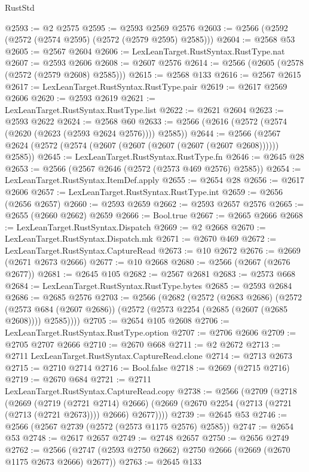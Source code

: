 \begin{lexlean}{RustStd}
\begin{coremodule}
@2593 := @2 @2575
@2595 := @2593 @2569 @2576
@2603 := @2566 (@2592 (@2572 (@2574 @2595) (@2572 (@2579 @2595) @2585)))
@2604 := @2568 @53
@2605 := @2567 @2604
@2606 := LexLeanTarget.RustSyntax.RustType.nat
@2607 := @2593 @2606
@2608 := @2607 @2576
@2614 := @2566 (@2605 (@2578 (@2572 (@2579 @2608) @2585)))
@2615 := @2568 @133
@2616 := @2567 @2615
@2617 := LexLeanTarget.RustSyntax.RustType.pair
@2619 := @2617 @2569 @2606
@2620 := @2593 @2619
@2621 := LexLeanTarget.RustSyntax.RustType.list
@2622 := @2621 @2604
@2623 := @2593 @2622
@2624 := @2568 @60
@2633 := @2566 (@2616 (@2572 (@2574 (@2620 (@2623 (@2593 @2624 @2576)))) @2585))
@2644 := @2566 (@2567 @2624 (@2572 (@2574 (@2607 (@2607 (@2607 (@2607 (@2607 @2608)))))) @2585))
@2645 := LexLeanTarget.RustSyntax.RustType.fn
@2646 := @2645 @28
@2653 := @2566 (@2567 @2646 (@2572 (@2573 @469 @2576) @2585))
@2654 := LexLeanTarget.RustSyntax.ItemDef.apply
@2655 := @2654 @28
@2656 := @2617 @2606
@2657 := LexLeanTarget.RustSyntax.RustType.int
@2659 := @2656 (@2656 @2657)
@2660 := @2593 @2659
@2662 := @2593 @2657 @2576
@2665 := @2655 (@2660 @2662) @2659
@2666 := Bool.true
@2667 := @2665 @2666
@2668 := LexLeanTarget.RustSyntax.Dispatch
@2669 := @2 @2668
@2670 := LexLeanTarget.RustSyntax.Dispatch.mk
@2671 := @2670 @469
@2672 := LexLeanTarget.RustSyntax.CaptureRead
@2673 := @10 @2672
@2676 := @2669 (@2671 @2673 @2666)
@2677 := @10 @2668
@2680 := @2566 (@2667 (@2676 @2677))
@2681 := @2645 @105
@2682 := @2567 @2681
@2683 := @2573 @668
@2684 := LexLeanTarget.RustSyntax.RustType.bytes
@2685 := @2593 @2684
@2686 := @2685 @2576
@2703 := @2566
    (@2682
      (@2572
        (@2683 @2686)
        (@2572
          (@2573 @684 (@2607 @2686))
          (@2572 (@2573 @2254 (@2685 (@2607 (@2685 @2608)))) @2585))))
@2705 := @2654 @105 @2608
@2706 := LexLeanTarget.RustSyntax.RustType.option
@2707 := @2706 @2606
@2709 := @2705 @2707 @2666
@2710 := @2670 @668
@2711 := @2 @2672
@2713 := @2711 LexLeanTarget.RustSyntax.CaptureRead.clone
@2714 := @2713 @2673
@2715 := @2710 @2714
@2716 := Bool.false
@2718 := @2669 (@2715 @2716)
@2719 := @2670 @684
@2721 := @2711 LexLeanTarget.RustSyntax.CaptureRead.copy
@2738 := @2566
    (@2709
      (@2718
        (@2669
          (@2719 (@2721 @2714) @2666)
          (@2669 (@2670 @2254 (@2713 (@2721 (@2713 (@2721 @2673)))) @2666) @2677))))
@2739 := @2645 @53
@2746 := @2566 (@2567 @2739 (@2572 (@2573 @1175 @2576) @2585))
@2747 := @2654 @53
@2748 := @2617 @2657
@2749 := @2748 @2657
@2750 := @2656 @2749
@2762 := @2566 (@2747 (@2593 @2750 @2662) @2750 @2666 (@2669 (@2670 @1175 @2673 @2666) @2677))
@2763 := @2645 @133

\end{coremodule}
\end{lexlean}
